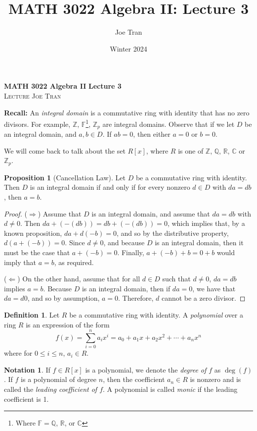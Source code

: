 \documentclass[11pt]{article}
\title{MATH 3022 Algebra II: Lecture 3}
\author{Joe Tran}
\date{Winter 2024}
\theoremstyle{definition}\newtheorem{definition}{Definition}
\theoremstyle{definition}\newtheorem*{notation}{Notation}
\theoremstyle{definition}\newtheorem{example}{Example}
\theoremstyle{theorem}\newtheorem{theorem}{Theorem}
\theoremstyle{theorem}\newtheorem{corollary}{Corollary}
\theoremstyle{theorem}\newtheorem{proposition}{Proposition}
\theoremstyle{theorem}\newtheorem{lemma}{Lemma}
\theoremstyle{theorem}\newtheorem{question}{Question}
\theoremstyle{remark}\newtheorem{remark}{Remark}
\newcommand{\C}{\mathbb{C}}
\newcommand{\R}{\mathbb{R}}
\newcommand{\Q}{\mathbb{Q}}
\newcommand{\Z}{\mathbb{Z}}
\newcommand{\F}{\mathbb{F}}
\begin{document}
\textbf{MATH 3022 Algebra II} \hfill \textbf{Lecture 3} \\
\textsc{Lecture} \hfill \textsc{Joe Tran}

\textbf{Recall:} An \emph{integral domain} is a commutative ring with identity that has no zero divisors. For example, $\Z$, $\F$\footnote{Where $\F = \Q$, $\R$, or $\C$}, $\Z_p$ are integral domains. Observe that if we let $D$ be an integral domain, and $a, b \in D$. If $ab = 0$, then either $a = 0$ or $b = 0$.

We will come back to talk about the set $R[x]$, where $R$ is one of $\Z$, $\Q$, $\R$, $\C$ or $\Z_p$.

\begin{proposition}[Cancellation Law]\label{proposition:1}
    Let $D$ be a commutative ring with identity. Then $D$ is an integral domain if and only if for every nonzero $d \in D$ with $da = db$, then $a = b$.
\end{proposition}

\begin{proof}
    ($\Rightarrow$) Assume that $D$ is an integral domain, and assume that $da = db$ with $d \neq 0$. Then $da + (-(db)) = db + (-(db)) = 0$, which implies that, by a known proposition, $da + d(-b) = 0$, and so by the distributive property, $d(a + (-b)) = 0$. Since $d \neq 0$, and because $D$ is an integral domain, then it must be the case that $a + (-b) = 0$. Finally, $a + (-b) + b = 0 + b$ would imply that $a = b$, as required.

    ($\Leftarrow$) On the other hand, assume that for all $d \in D$ such that $d \neq 0$, $da = db$ implies $a = b$. Because $D$ is an integral domain, then if $da = 0$, we have that $da = d0$, and so by assumption, $a = 0$. Therefore, $d$ cannot be a zero divisor.
\end{proof}

\begin{definition}\label{definition:1}
    Let $R$ be a commutative ring with identity. A \emph{polynomial} over a ring $R$ is an expression of the form
    \begin{equation*}
        f(x) = \sum_{i = 0}^{n} a_ix^i = a_0 + a_1x + a_2x^2 + \cdots + a_nx^n
    \end{equation*}
    where for $0 \leq i \leq n$, $a_i \in R$.
\end{definition}

\begin{notation}
    If $f \in R[x]$ is a polynomial, we denote the \emph{degree of $f$} as $\deg(f)$. If $f$ is a polynomial of degree $n$, then the coefficient $a_n \in R$ is nonzero and is called the \emph{leading coefficient of $f$}. A polynomial is called \emph{monic} if the leading coefficient is 1.
\end{notation}
\end{document}
